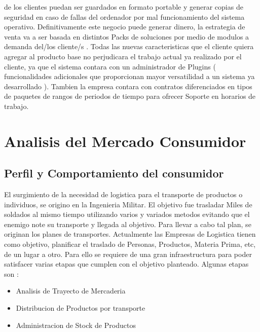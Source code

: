 \documentclass[
10pt, %
a4paper, %
oneside, %
headinclude,footinclude, %
BCOR5mm, %
]{scrartcl}
\begin{document}
de los clientes puedan ser guardados en formato portable y generar copias de
seguridad en caso de fallas del ordenador por mal funcionamiento del
sistema operativo.
\newline\newline
Definitivamente este negocio puede generar dinero, la estrategia de venta
va a ser basada en distintos Packs de soluciones por medio de modulos
a demanda del/los cliente/s . Todas las nuevas caracteristicas que el cliente
quiera agregar al producto base no perjudicara el trabajo actual ya realizado
por el cliente, ya que el sistema contara con un administrador de
Plugins ( funcionalidades adicionales que proporcionan mayor versatilidad a un
sistema ya desarrollado ).
\newline\newline
Tambien la empresa contara con contratos diferenciados en tipos de paquetes de
rangos de periodos de tiempo para ofrecer Soporte en horarios de trabajo.

\section{Analisis del Mercado Consumidor}
\subsection{Perfil y Comportamiento del consumidor}
  El surgimiento de la necesidad de logistica para el transporte de
  productos o individuos, se origino en la Ingenieria Militar.
  El objetivo fue trasladar Miles de soldados al mismo tiempo utilizando
  varios y variados metodos evitando que el enemigo note su transporte
  y llegada al objetivo.
  Para llevar a cabo tal plan, se originan los planes de transportes.
  \newline\newline
  Actualmente las Empresas de Logistica tienen como objetivo, planificar el
  traslado de Personas, Productos, Materia Prima, etc, de un lugar a otro.
  Para ello se requiere de una gran infraestructura para poder satisfacer
  varias etapas que cumplen con el objetivo planteado.
  \newline\newline
  Algunas etapas son :
  \begin{itemize}
    \item  Analisis de Trayecto de Mercaderia
    \item  Distribucion de Productos por transporte
    \item  Administracion de Stock de Productos
  \end{itemize}
\end{document}
